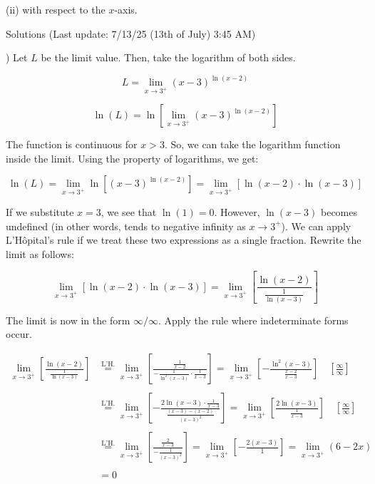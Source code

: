 \documentclass{article}
\begin{document}
\noindent (ii) with respect to the $x$-axis.

\hfill

\newpage

\begin{center}
Solutions (Last update: 7/13/25 (13th of July) 3:45 AM)
\end{center}

) Let $L$ be the limit value. Then, take the logarithm of both sides.

\begin{equation*}L = \lim_{x\to3^+}(x-3)^{\ln(x-2)}\end{equation*}

\begin{equation*}\ln(L) = \ln\left[\lim_{x\to3^+}(x-3)^{\ln(x-2)}\right]\end{equation*}

\hfill

\noindent The function is continuous for $x > 3$. So, we can take the logarithm function inside the limit. Using the property of logarithms, we get:

\begin{equation*}\ln(L) = \lim_{x\to3^+}\ln\left[(x-3)^{\ln(x-2)}\right] = \lim_{x\to3^+}\left[\ln(x-2)\cdot \ln(x-3)\right]\end{equation*}

\hfill

\noindent If we substitute $x=3$, we see that $\ln(1) = 0$. However, $\ln(x-3)$ becomes undefined (in other words, tends to negative infinity as $x\to3^+$). We can apply L'Hôpital's rule if we treat these two expressions as a single fraction. Rewrite the limit as follows:

\begin{equation*}\lim_{x\to3^+}\left[\ln(x-2) \cdot \ln(x-3)\right] =\lim_{x\to3^+}\left[\frac{\ln(x-2)}{\frac{1}{\ln(x-3)}}\right]  \end{equation*}

\hfill

\noindent The limit is now in the form $\infty/\infty$. Apply the rule where indeterminate forms occur.

\begin{align*}
    \lim_{x\to3^+}\left[\frac{\ln(x-2)}{\frac{1}{\ln(x-3)}}\right] &\overset{\text{L'H.}}{=} \lim_{x\to3^+} \left[\frac{\frac{1}{x-2}}{-\frac{1}{\ln^2(x-3)}\cdot {\frac{1}{x-3}}}\right] = \lim_{x\to3^+} \left[-\frac{\ln^2(x-3)}{\frac{x-2}{x-3}}\right] \quad \left[\frac{\infty}{\infty}\right] \\\\
    &\overset{\text{L'H.}}{=} \lim_{x\to3^+}\left[-\frac{2\ln(x-3)\cdot\frac{1}{x-3}}{\frac{(x-3) -(x-2)}{(x-3)^2}}\right] = \lim_{x\to3^+} \left[\frac{2\ln(x-3)}{\frac{1}{x-3}}\right] \quad \left[\frac{\infty}{\infty}\right] \\\\
    &\overset{\text{L'H.}}{=} \lim_{x\to3^+} \left[\frac{\frac{2}{x-3}}{-\frac{1}{(x-3)^2}}\right] = \lim_{x\to3^+} \left[-\frac{2(x-3)}{1}\right] = \lim_{x\to3^+} (6-2x)\\\\&=0
\end{align*}
\end{document}
